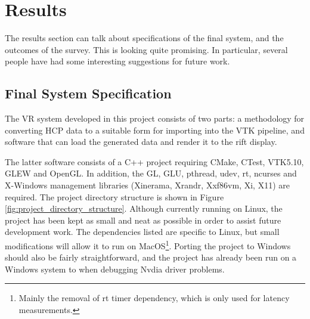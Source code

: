 \documentclass[MSc,paper=a4,pagesize=auto]{icldt}
\begin{document}
\chapter{Results}
The results section can talk about specifications of the final system, and the outcomes of the survey. This is looking quite promising. In particular, several people have had some interesting suggestions for future work. 

\section{Final System Specification}
The VR system developed in this project consists of two parts: a methodology for converting HCP data to a suitable form for importing into the VTK pipeline, and software that can load the generated data and render it to the rift display. 

The latter software consists of a C++ project requiring CMake, CTest, VTK5.10, GLEW and OpenGL. In addition, the GL, GLU, pthread, udev, rt, ncurses and X-Windows management libraries (Xinerama, Xrandr, Xxf86vm, Xi, X11) are required. The project directory structure is shown in Figure \ref{fig:project_directory_structure}. Although currently running on Linux, the project has been kept as small and neat as possible in order to assist future development work. The dependencies listed are specific to Linux, but small modifications will allow it to run on MacOS\footnote{Mainly the removal of rt timer dependency, which is only used for latency measurements.}. Porting the project to Windows should also be fairly straightforward, and the project has already been run on a Windows system to when debugging Nvdia driver problems.
\end{document}
